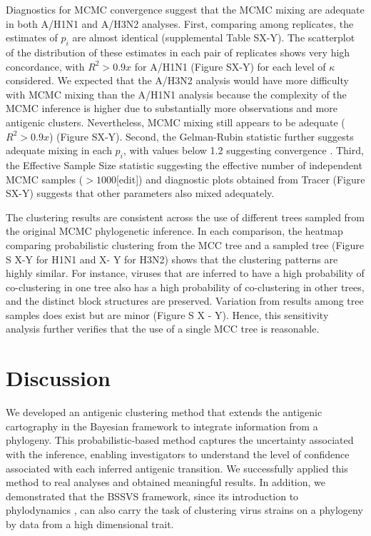 \documentclass[11pt,oneside,letterpaper]{article}
\begin{document}
Diagnostics for MCMC convergence suggest that the MCMC mixing are adequate in both A/H1N1 and A/H3N2 analyses. 
First, comparing among replicates, the estimates of $p_i$ are almost identical (supplemental Table SX-Y). 
The scatterplot of the distribution of these estimates in each pair of replicates shows very high concordance, with $R^2 > 0.9x$  for A/H1N1 (Figure SX-Y) for each level of $\kappa$ considered. 
We expected that the A/H3N2 analysis would have more difficulty with MCMC mixing than the A/H1N1 analysis because the complexity of the MCMC inference is higher due to substantially more observations and more antigenic clusters. 
Nevertheless, MCMC mixing still appears to be adequate ($R^2 > 0.9x$) (Figure SX-Y). 
Second, the Gelman-Rubin statistic further suggests adequate mixing in each $p_i$, with values below 1.2  suggesting convergence \cite{Yang_evolutionbook}. 
Third, the Effective Sample Size statistic suggesting the effective number of independent MCMC samples ($>1000$[edit]) and diagnostic plots obtained from Tracer (Figure SX-Y) suggests that other parameters also mixed adequately.

The clustering results are consistent across the use of different trees sampled from the original MCMC phylogenetic inference. In each comparison, the heatmap comparing probabilistic clustering from the MCC tree and a sampled tree (Figure S X-Y  for H1N1 and X- Y for H3N2) shows that the clustering patterns are highly similar. 
For instance, viruses that are inferred to have a high probability of co-clustering in one tree also has a high probability of co-clustering in other trees, and the distinct block structures are preserved. 
Variation from results among tree samples does exist but are minor (Figure S X - Y). 
Hence, this sensitivity analysis further verifies that the use of a single MCC tree is reasonable.



\newpage

\section*{Discussion}

We developed an antigenic clustering method that extends the antigenic cartography in the Bayesian framework to integrate information from a phylogeny. 
This probabilistic-based method captures the uncertainty associated with the inference, enabling investigators to understand the level of confidence associated with each inferred antigenic transition. 
We successfully applied this method to real analyses and obtained meaningful results.
In addition, we demonstrated that the BSSVS framework, since its introduction to phylodynamics \cite{lemey_bayesian_2009, drummond_bayesian_2010}, can also carry the task of clustering virus strains on a phylogeny by data from a high dimensional trait.  %
\end{document}
